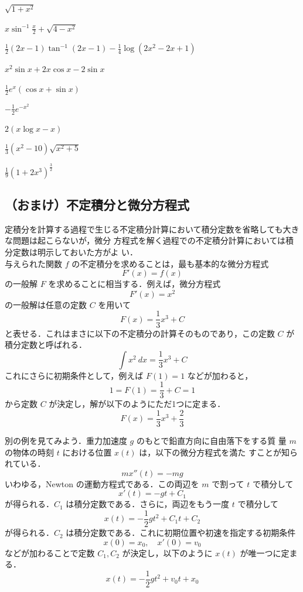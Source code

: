 \documentclass[10pt, uplatex, dvipdfmx]{jsarticle}
\theoremstyle{definition}
\numberwithin{equation}{section}
\newcommand{\ds}{\displaystyle}
\begin{document}
\begin{edaenumerate}
\item $\ds \sqrt{1+x^2}$

\item $\ds x\sin^{-1}\frac{x}{2} + \sqrt{4-x^2}$

\item<1> $\ds \frac{1}{2}\left(2x-1\right)\tan^{-1}\left(2x-1\right)-\frac{1}{4}\log \left(2x^2-2x+1\right)$ 

\item<2> $\ds x^2\sin x + 2x\cos x - 2 \sin x$

\item $\ds \frac{1}{2}e^x\left( \cos x + \sin x\right)$

\item $\ds -\frac{1}{2}e^{-x^2}$

\item $\ds 2 \left( x \log x - x\right)$

\item $\ds \frac{1}{3}\left(x^2-10 \right)\sqrt{x^2+5}$

\item $\ds \frac{1}{9} \left(1+2x^3\right)^{\frac{3}{2}}$

\end{edaenumerate}

\newpage

\subsection{（おまけ）不定積分と微分方程式}

定積分を計算する過程で生じる不定積分計算において積分定数を省略しても大きな問題は起こらないが，微分
方程式を解く過程での不定積分計算においては積分定数は明示しておいた方がよ
い．\\

与えられた関数 $f$ の不定積分を求めることは，最も基本的な微分方程式
\[
  F'(x) = f(x)
\]
の一般解 $F$ を求めることに相当する．例えば，微分方程式
\[
  F'(x) = x^2
\]
の一般解は任意の定数 $C$ を用いて
\[
  F(x) = \frac{1}{3}x^3 + C 
\]
と表せる．これはまさに以下の不定積分の計算そのものであり，この定数 $C$ が積分定数と呼ばれる．
\[
  \int x^2 \ dx = \frac{1}{3} x^3 +C
\]
これにさらに初期条件として，例えば $F(1) = 1$ などが加わると，
\[
  1=F(1) = \frac{1}{3}+C= 1
\]
から定数 $C$ が決定し，解が以下のようにただ1つに定まる．
\[
  F(x) = \frac{1}{3}x^3 + \frac{2}{3}
\]

別の例を見てみよう．重力加速度 $g$ のもとで鉛直方向に自由落下をする質
量 $m$ の物体の時刻 $t$ における位置 $x(t)$ は，以下の微分方程式を満た
すことが知られている．
\[
  mx''(t) = -mg
\]
いわゆる，Newton の運動方程式である．この両辺を $m$ で割って $t$ で積分して
\[
  x'(t) = -g t +C_1
\]
が得られる．$C_1$ は積分定数である．さらに，両辺をもう一度 $t$ で積分して
\[
  x(t) = -\frac{1}{2}g t^2 + C_1 t + C_2
\]
が得られる．$C_2$ は積分定数である．これに初期位置や初速を指定する初期条件
\[
  x(0) = x_0, \quad x'(0)= v_0
\]
などが加わることで定数 $C_1, C_2$ が決定し，以下のように $x(t)$ が唯一つに定まる．
\[
  x(t) = -\frac{1}{2}g t^2 + v_0 t + x_0
\]
\end{document}
